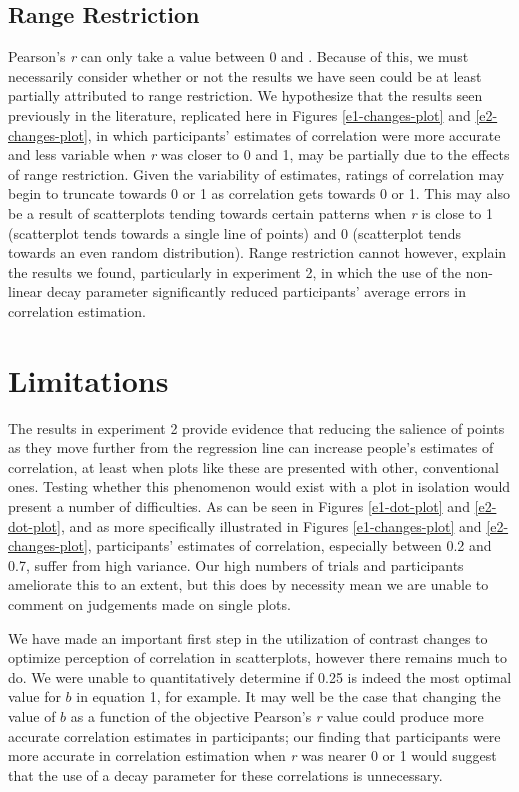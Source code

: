 \documentclass[preprint, 3p,
authoryear]{elsarticle} %
\begin{document}
\hypertarget{range-restriction}{%
\subsection{Range Restriction}\label{range-restriction}}

Pearson's \emph{r} can only take a value between 0 and
\textbar. Because of this, we must necessarily consider whether
or not the results we have seen could be at least partially attributed
to range restriction. We hypothesize that the results seen previously in
the literature, replicated here in Figures \ref{e1-changes-plot} and
\ref{e2-changes-plot}, in which participants' estimates of correlation
were more accurate and less variable when \emph{r} was closer to 0 and
1, may be partially due to the effects of range restriction. Given the
variability of estimates, ratings of correlation may begin to truncate
towards 0 or 1 as correlation gets towards 0 or 1. This may also be a
result of scatterplots tending towards certain patterns when \emph{r} is
close to 1 (scatterplot tends towards a single line of points) and 0
(scatterplot tends towards an even random distribution). Range
restriction cannot however, explain the results we found, particularly
in experiment 2, in which the use of the non-linear decay parameter
significantly reduced participants' average errors in correlation
estimation.

\hypertarget{limitations}{%
\section{Limitations}\label{limitations}}

The results in experiment 2 provide evidence that reducing the salience
of points as they move further from the regression line can increase
people's estimates of correlation, at least when plots like these are
presented with other, conventional ones. Testing whether this phenomenon
would exist with a plot in isolation would present a number of
difficulties. As can be seen in Figures \ref{e1-dot-plot} and
\ref{e2-dot-plot}, and as more specifically illustrated in Figures
\ref{e1-changes-plot} and \ref{e2-changes-plot}, participants' estimates
of correlation, especially between 0.2 and 0.7, suffer from high
variance. Our high numbers of trials and participants ameliorate this to
an extent, but this does by necessity mean we are unable to comment on
judgements made on single plots.

We have made an important first step in the utilization of contrast
changes to optimize perception of correlation in scatterplots, however
there remains much to do. We were unable to quantitatively determine if
0.25 is indeed the most optimal value for \(b\) in equation 1, for
example. It may well be the case that changing the value of \(b\) as a
function of the objective Pearson's \emph{r} value could produce more
accurate correlation estimates in participants; our finding that
participants were more accurate in correlation estimation when \emph{r}
was nearer 0 or 1 would suggest that the use of a decay parameter for
these correlations is unnecessary.
\end{document}
